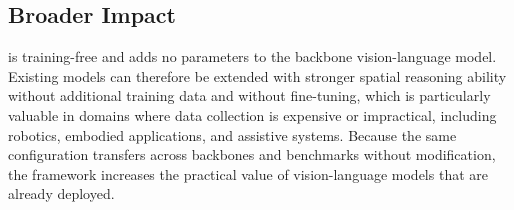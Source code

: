\subsection{Broader Impact}
\label{app:broader_impact}
\ours{} is training-free and adds no parameters to the backbone vision-language model. Existing models can therefore be extended with stronger spatial reasoning ability without additional training data and without fine-tuning, which is particularly valuable in domains where data collection is expensive or impractical, including robotics, embodied applications, and assistive systems. Because the same configuration transfers across backbones and benchmarks without modification, the framework increases the practical value of vision-language models that are already deployed.
